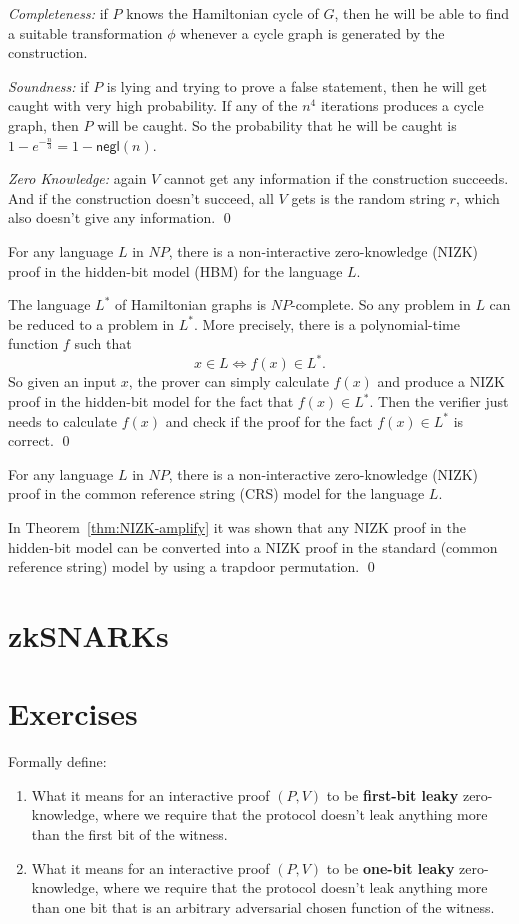 \textit{Completeness:} if $P$ knows the Hamiltonian cycle of $G$,
then he will be able to find a suitable transformation $\phi$ whenever a cycle graph is
generated by the construction.

\textit{Soundness:} if $P$ is lying and trying to prove a false statement, then he will
get caught with very high probability. If any of the $n^4$ iterations produces a cycle
graph, then $P$ will be caught. So the probability that he will be caught is
$1-e^{-\frac{n}{3}} = 1-\mathsf{negl}(n)$.

\textit{Zero Knowledge:} again $V$ cannot get any information if the construction succeeds.
And if the construction doesn't succeed, all $V$ gets is the random string $r$, which also
doesn't give any information.
\qed


\begin{theorem}
For any language $L$ in $NP$, there is a non-interactive zero-knowledge (NIZK) proof
in the hidden-bit model (HBM) for the language $L$.
\end{theorem}
\proof
The language $L^*$ of Hamiltonian graphs is $NP$-complete. So any problem in $L$ can
be reduced to a problem in $L^*$. More precisely, there is a polynomial-time function
$f$ such that
$$x\in L \Longleftrightarrow f(x)\in L^*.$$
So given an input $x$, the prover can simply calculate $f(x)$ and
produce a NIZK proof in the hidden-bit model for the fact that $f(x)\in L^*$.
Then the verifier just needs to calculate $f(x)$ and check if the proof for the fact
$f(x)\in L^*$ is correct.
\qed

\begin{theorem}\label{the:NIZK_NP}
For any language $L$ in $NP$, there is a non-interactive zero-knowledge (NIZK) proof
in the common reference string (CRS) model for the language $L$.
\end{theorem}
\proof
In Theorem~\ref{thm:NIZK-amplify} it was shown that any NIZK proof in the hidden-bit model can
be converted into a NIZK proof in the standard (common reference string) model by using
a trapdoor permutation.
\qed

\section{zkSNARKs}
\section*{Exercises}
\begin{exercise} Formally define:
\begin{enumerate}
  \item 
What it means for an  interactive proof $(P,V)$ to be \textbf{first-bit leaky} zero-knowledge, where we require that the protocol doesn't leak anything more than the first bit of the witness.

\item What it means for an  interactive proof $(P,V)$ to be \textbf{one-bit leaky} zero-knowledge, where we require that the protocol doesn't leak anything more than one bit that is an arbitrary adversarial chosen function of the witness.
    \end{enumerate}
\end{exercise}

